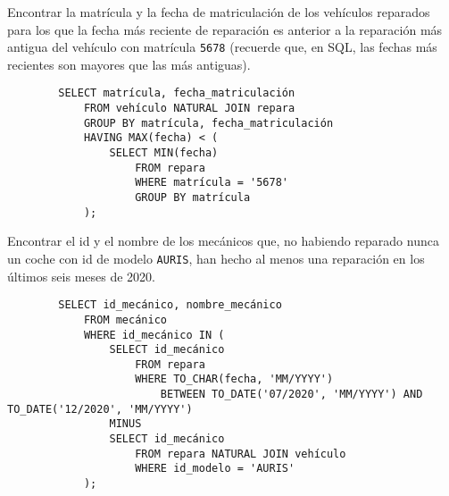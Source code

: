 \documentclass[12pt]{article}
\begin{document}
\begin{ejercicio}[SQL]
    Encontrar la matrícula y la fecha de matriculación de los vehículos reparados para los que la fecha más reciente de reparación es anterior a la reparación más antigua del vehículo con matrícula \verb|5678| (recuerde que, en SQL, las fechas más recientes son mayores que las más antiguas).
    \begin{verbatim}
        SELECT matrícula, fecha_matriculación
            FROM vehículo NATURAL JOIN repara
            GROUP BY matrícula, fecha_matriculación
            HAVING MAX(fecha) < (
                SELECT MIN(fecha)
                    FROM repara
                    WHERE matrícula = '5678'
                    GROUP BY matrícula
            );
    \end{verbatim}
\end{ejercicio}

\begin{ejercicio}[SQL]
    Encontrar el id y el nombre de los mecánicos que, no habiendo reparado nunca un coche con id de modelo \verb|AURIS|, han hecho al menos una reparación en los últimos seis meses de 2020.
    \begin{verbatim}
        SELECT id_mecánico, nombre_mecánico
            FROM mecánico
            WHERE id_mecánico IN (
                SELECT id_mecánico
                    FROM repara
                    WHERE TO_CHAR(fecha, 'MM/YYYY')
                        BETWEEN TO_DATE('07/2020', 'MM/YYYY') AND TO_DATE('12/2020', 'MM/YYYY')
                MINUS
                SELECT id_mecánico
                    FROM repara NATURAL JOIN vehículo
                    WHERE id_modelo = 'AURIS'
            );
    \end{verbatim}
\end{ejercicio}
\end{document}
